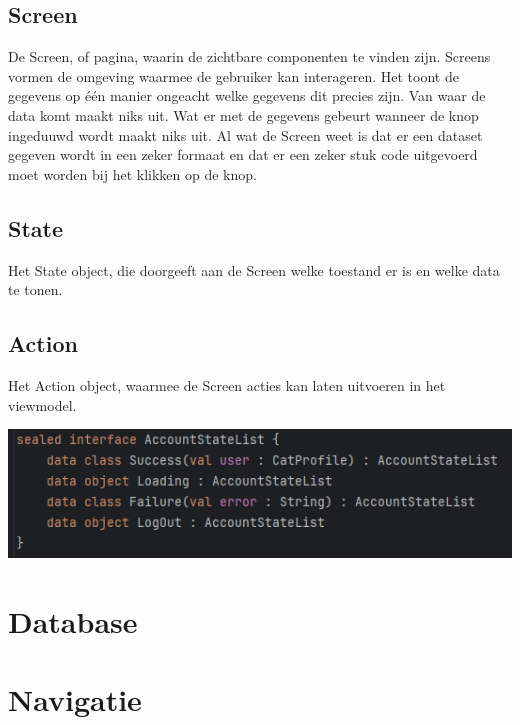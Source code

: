 \documentclass{article}
\begin{document}
\subsection{Screen}
De Screen, of pagina, waarin de zichtbare componenten te vinden zijn. Screens vormen de omgeving waarmee de gebruiker kan interageren.
Het toont de gegevens op één manier ongeacht welke gegevens dit precies zijn. Van waar de data komt maakt niks uit. Wat er met de gegevens gebeurt wanneer de knop ingeduuwd wordt maakt niks uit.
Al wat de Screen weet is dat er een dataset gegeven wordt in een zeker formaat en dat er een zeker stuk code uitgevoerd moet worden bij het klikken op de knop.

\subsection{State}
Het State object, die doorgeeft aan de Screen welke toestand er is en welke data te tonen.

\subsection{Action}

Het Action object, waarmee de Screen acties kan laten uitvoeren in het viewmodel.

\includegraphics{VM_Action}



\section{Database}

\section{Navigatie}
\end{document}
